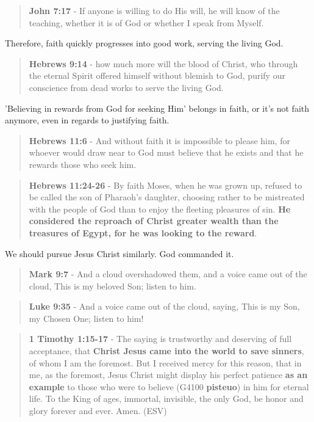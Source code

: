 \documentclass[11pt]{article}
\begin{document}
\begin{quote}
\textbf{John 7:17} - If anyone is willing to do His will, he will know of the teaching, whether it is of God or whether I speak from Myself.
\end{quote}

Therefore, faith quickly progresses into good work, serving the living God.

\begin{quote}
\textbf{Hebrews 9:14} - how much more will the blood of Christ, who through the eternal Spirit offered himself without blemish to God, purify our conscience from dead works to serve the living God.
\end{quote}

'Believing in rewards from God for seeking Him' belongs in faith, or it's not faith anymore, even in regards to justifying faith.

\begin{quote}
\textbf{Hebrews 11:6} - And without faith it is impossible to please him, for whoever would draw near to God must believe that he exists and that he rewards those who seek him.
\end{quote}

\begin{quote}
\textbf{Hebrews 11:24-26} - By faith Moses, when he was grown up, refused to be called the son of Pharaoh's daughter, choosing rather to be mistreated with the people of God than to enjoy the fleeting pleasures of sin. \textbf{He considered the reproach of Christ greater wealth than the treasures of Egypt, for he was looking to the reward}.
\end{quote}

We should pursue Jesus Christ similarly. God commanded it.

\begin{quote}
\textbf{Mark 9:7} - And a cloud overshadowed them, and a voice came out of the cloud, This is my beloved Son; listen to him.
\end{quote}

\begin{quote}
\textbf{Luke 9:35} - And a voice came out of the cloud, saying, This is my Son, my Chosen One; listen to him!
\end{quote}

\begin{quote}
\textbf{1 Timothy 1:15-17} - The saying is trustworthy and deserving of full acceptance, that \textbf{Christ Jesus came into the world to save sinners}, of whom I am the foremost. But I received mercy for this reason, that in me, as the foremost, Jesus Christ might display his perfect patience \textbf{as an example} to those who were to believe (G4100 \textbf{pisteuo}) in him for eternal life. To the King of ages, immortal, invisible, the only God, be honor and glory forever and ever. Amen. (ESV)
\end{quote}
\end{document}
